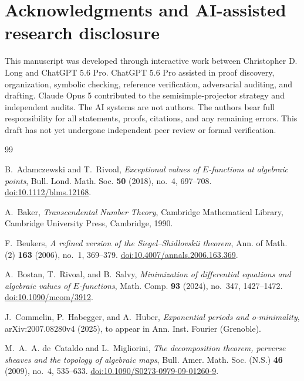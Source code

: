 \documentclass[11pt]{article}
\numberwithin{equation}{section}
\theoremstyle{definition}
\theoremstyle{remark}
\begin{document}
\section*{Acknowledgments and AI-assisted research disclosure}

This manuscript was developed through interactive work between Christopher
D. Long and ChatGPT 5.6 Pro.  ChatGPT 5.6 Pro assisted in proof discovery,
organization, symbolic checking, reference verification, adversarial
auditing, and drafting.  Claude Opus 5 contributed to the
semisimple-projector strategy and independent audits.  The AI systems are
not authors.  The authors bear full responsibility for all statements,
proofs, citations, and any remaining errors.  This draft has not yet
undergone independent peer review or formal verification.

\small
\begin{thebibliography}{99}

B.~Adamczewski and T.~Rivoal,
\emph{Exceptional values of $E$-functions at algebraic points},
Bull. Lond. Math. Soc. \textbf{50} (2018), no.~4, 697--708.
\href{https://doi.org/10.1112/blms.12168}{doi:10.1112/blms.12168}.

A.~Baker,
\emph{Transcendental Number Theory},
Cambridge Mathematical Library,
Cambridge University Press, Cambridge, 1990.

F.~Beukers,
\emph{A refined version of the Siegel--Shidlovskii theorem},
Ann. of Math. (2) \textbf{163} (2006), no.~1, 369--379.
\href{https://doi.org/10.4007/annals.2006.163.369}{doi:10.4007/annals.2006.163.369}.

A.~Bostan, T.~Rivoal, and B.~Salvy,
\emph{Minimization of differential equations and algebraic values of
$E$-functions},
Math. Comp. \textbf{93} (2024), no.~347, 1427--1472.
\href{https://doi.org/10.1090/mcom/3912}{doi:10.1090/mcom/3912}.

J.~Commelin, P.~Habegger, and A.~Huber,
\emph{Exponential periods and o-minimality},
arXiv:2007.08280v4 (2025), to appear in
Ann. Inst. Fourier (Grenoble).

M.~A.~A. de~Cataldo and L.~Migliorini,
\emph{The decomposition theorem, perverse sheaves and the topology of
algebraic maps},
Bull. Amer. Math. Soc. (N.S.) \textbf{46} (2009), no.~4, 535--633.
\href{https://doi.org/10.1090/S0273-0979-09-01260-9}{doi:10.1090/S0273-0979-09-01260-9}.


\end{thebibliography}
\end{document}
